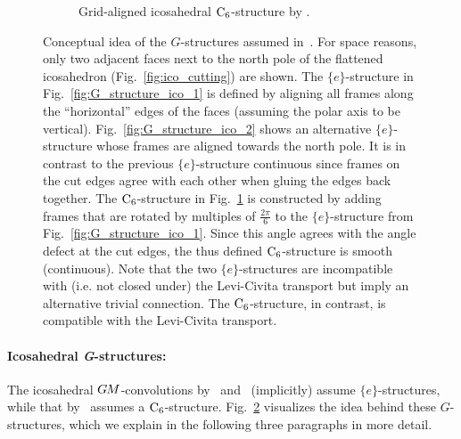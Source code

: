 \begin{figure}
\begin{subfigure}[b]{0.31\textwidth}
        \vspace*{-6pt}
        \captionsetup{width=.9\textwidth}
        \caption{\small
            Grid-aligned icosahedral $\operatorname{C}_{6}$-structure by \citet{gaugeIco2019}.
        }
        \label{fig:G_structure_ico_3}
    \end{subfigure}
    \caption{\small
        Conceptual idea of the $G$-structures assumed in~\cite{liu2018icoAltAz,zhang2019orientation,gaugeIco2019}.
        For space reasons, only two adjacent faces next to the north pole of the flattened icosahedron (Fig.~\ref{fig:ico_cutting}) are shown.
        The $\{e\}$-structure in Fig.~\ref{fig:G_structure_ico_1} is defined by aligning all frames along the ``horizontal'' edges of the faces (assuming the polar axis to be vertical).
        Fig.~\ref{fig:G_structure_ico_2} shows an alternative $\{e\}$-structure whose frames are aligned towards the north pole.
        It is in contrast to the previous $\{e\}$-structure continuous since frames on the cut edges agree with each other when gluing the edges back together.
        The $\operatorname{C}_{6}$-structure in Fig.~\ref{fig:G_structure_ico_3} is constructed by adding frames that are rotated by multiples of $\frac{2\pi}{6}$ to the $\{e\}$-structure from Fig.~\ref{fig:G_structure_ico_1}.
        Since this angle agrees with the angle defect at the cut edges, the thus defined $\operatorname{C}_{6}$-structure is smooth (continuous).
        Note that the two $\{e\}$-structures are incompatible with (i.e. not closed under) the Levi-Civita transport but imply an alternative trivial connection.
        The $\operatorname{C}_{6}$-structure, in contrast, is compatible with the Levi-Civita transport.
     }
    \label{fig:G_structures_ico}
\end{figure}


\paragraph{Icosahedral \textit{G}-structures:}
The icosahedral $G\mkern-1.4muM$-convolutions by~\citet{liu2018icoAltAz} and~\citet{zhang2019orientation} (implicitly) assume $\{e\}$-structures, while that by~\citet{gaugeIco2019} assumes a $\operatorname{C}_{6}$-structure.
Fig.~\ref{fig:G_structures_ico} visualizes the idea behind these $G$-structures, which we explain in the following three paragraphs in more detail.


